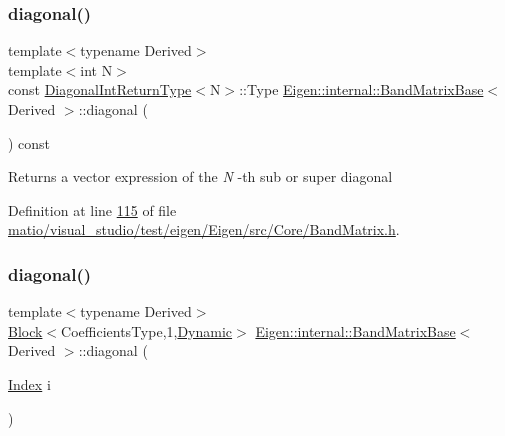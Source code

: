 \subsubsection{\texorpdfstring{diagonal()}{diagonal()}\hspace{0.1cm}{\footnotesize\ttfamily [8/12]}}
{\footnotesize\ttfamily template$<$typename Derived$>$ \\
template$<$int N$>$ \\
const \hyperlink{struct_eigen_1_1internal_1_1_band_matrix_base_1_1_diagonal_int_return_type}{Diagonal\+Int\+Return\+Type}$<$N$>$\+::Type \hyperlink{class_eigen_1_1internal_1_1_band_matrix_base}{Eigen\+::internal\+::\+Band\+Matrix\+Base}$<$ Derived $>$\+::diagonal (\begin{DoxyParamCaption}{ }\end{DoxyParamCaption}) const\hspace{0.3cm}{\ttfamily [inline]}}

\begin{DoxyReturn}{Returns}
a vector expression of the {\itshape N} -\/th sub or super diagonal 
\end{DoxyReturn}


Definition at line \hyperlink{matio_2visual__studio_2test_2eigen_2_eigen_2src_2_core_2_band_matrix_8h_source_l00115}{115} of file \hyperlink{matio_2visual__studio_2test_2eigen_2_eigen_2src_2_core_2_band_matrix_8h_source}{matio/visual\+\_\+studio/test/eigen/\+Eigen/src/\+Core/\+Band\+Matrix.\+h}.

\mbox{\label{class_eigen_1_1internal_1_1_band_matrix_base_a51ce12f0be57b0c2593c20c865de6af1}} 
\subsubsection{\texorpdfstring{diagonal()}{diagonal()}\hspace{0.1cm}{\footnotesize\ttfamily [9/12]}}
{\footnotesize\ttfamily template$<$typename Derived$>$ \\
\hyperlink{group___core___module_class_eigen_1_1_block}{Block}$<$Coefficients\+Type,1,\hyperlink{namespace_eigen_ad81fa7195215a0ce30017dfac309f0b2}{Dynamic}$>$ \hyperlink{class_eigen_1_1internal_1_1_band_matrix_base}{Eigen\+::internal\+::\+Band\+Matrix\+Base}$<$ Derived $>$\+::diagonal (\begin{DoxyParamCaption}\item[{\hyperlink{group___core___module_a554f30542cc2316add4b1ea0a492ff02}{Index}}]{i }\end{DoxyParamCaption})\hspace{0.3cm}{\ttfamily [inline]}}


